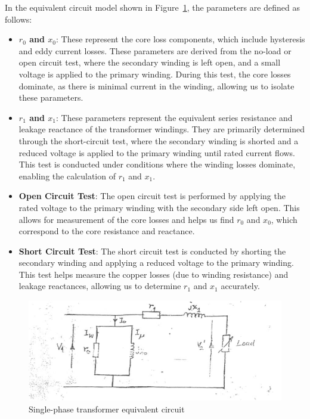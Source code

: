 \documentclass[12pt,a4paper]{report}
\begin{document}
In the equivalent circuit model shown in Figure~\ref{fig_1}, the parameters are defined as follows:
\begin{itemize}
    \item \textbf{\( r_0 \) and \( x_0 \)}: These represent the core loss components, which include hysteresis and eddy current losses. These parameters are derived from the no-load or open circuit test, where the secondary winding is left open, and a small voltage is applied to the primary winding. During this test, the core losses dominate, as there is minimal current in the winding, allowing us to isolate these parameters.

    \item \textbf{\( r_1 \) and \( x_1 \)}: These parameters represent the equivalent series resistance and leakage reactance of the transformer windings. They are primarily determined through the short-circuit test, where the secondary winding is shorted and a reduced voltage is applied to the primary winding until rated current flows. This test is conducted under conditions where the winding losses dominate, enabling the calculation of \( r_1 \) and \( x_1 \).

    \item \textbf{Open Circuit Test}: The open circuit test is performed by applying the rated voltage to the primary winding with the secondary side left open. This allows for measurement of the core losses and helps us find \( r_0 \) and \( x_0 \), which correspond to the core resistance and reactance.

    \item \textbf{Short Circuit Test}: The short circuit test is conducted by shorting the secondary winding and applying a reduced voltage to the primary winding. This test helps measure the copper losses (due to winding resistance) and leakage reactances, allowing us to determine \( r_1 \) and \( x_1 \) accurately.

\end{itemize}

\begin{figure}[H]
    \centering
    \includegraphics[width=0.8\linewidth]{figure_1_1.jpeg}
    \caption{Single-phase transformer equivalent circuit}
    \label{fig_1}
\end{figure}
\end{document}

